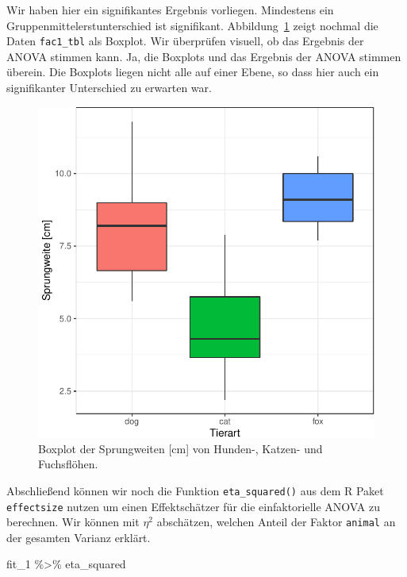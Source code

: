 \documentclass[
  letterpaper,
  DIV=11,
  oneside]{scrreport}
\newenvironment{Shaded}{\begin{snugshade}}{\end{snugshade}}
\newcommand{\NormalTok}[1]{\textcolor[rgb]{0.00,0.23,0.31}{#1}}
\newcommand{\SpecialCharTok}[1]{\textcolor[rgb]{0.37,0.37,0.37}{#1}}
\begin{document}
Wir haben hier ein signifikantes Ergebnis vorliegen. Mindestens ein
Gruppenmittelerstunterschied ist signifikant.
Abbildung~\ref{fig-boxplot-anova-1} zeigt nochmal die Daten
\texttt{fac1\_tbl} als Boxplot. Wir überprüfen visuell, ob das Ergebnis
der ANOVA stimmen kann. Ja, die Boxplots und das Ergebnis der ANOVA
stimmen überein. Die Boxplots liegen nicht alle auf einer Ebene, so dass
hier auch ein signifikanter Unterschied zu erwarten war.

\begin{figure}

{\centering \includegraphics{./stat-tests-anova_files/figure-pdf/fig-boxplot-anova-1-1.pdf}

}

\caption{\label{fig-boxplot-anova-1}Boxplot der Sprungweiten {[}cm{]}
von Hunden-, Katzen- und Fuchsflöhen.}

\end{figure}

Abschließend können wir noch die Funktion \texttt{eta\_squared()} aus
dem R Paket \texttt{effectsize} nutzen um einen Effektschätzer für die
einfaktorielle ANOVA zu berechnen. Wir können mit \(\eta^2\) abschätzen,
welchen Anteil der Faktor \texttt{animal} an der gesamten Varianz
erklärt.

\begin{Shaded}
\begin{Highlighting}[]
\NormalTok{fit\_1 }\SpecialCharTok{\%\textgreater{}\%}\NormalTok{ eta\_squared}
\end{Highlighting}
\end{Shaded}
\end{document}
